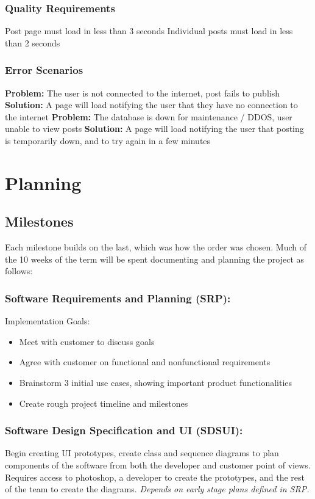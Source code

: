 \documentclass[12pt]{article}
\begin{document}
  \subsubsection{Quality Requirements}
  Post page must load in less than 3 seconds
  Individual posts must load in less than 2 seconds


  \subsubsection{Error Scenarios}
  \textbf{Problem:}
  The user is not connected to the internet, post fails to publish
  \textbf{Solution:}
    A page will load notifying the user that they have no connection to the internet
  \textbf{Problem:}
  The database is down for maintenance / DDOS, user unable to view posts
  \textbf{Solution:}
    A page will load notifying the user that posting is temporarily down, and to try again in a few minutes

\section{Planning}
\subsection{Milestones}
Each milestone builds on the last, which was how the order was chosen.
Much of the 10 weeks of the term will be spent documenting and planning the project as follows:

\subsubsection{Software Requirements and Planning (SRP):}
Implementation Goals:
\begin{itemize}
  \item Meet with customer to discuss goals
  \item Agree with customer on functional and nonfunctional requirements
  \item Brainstorm 3 initial use cases, showing important product functionalities
  \item Create rough project timeline and milestones
\end{itemize}

\subsubsection{Software Design Specification and UI (SDSUI):}
Begin creating UI prototypes, create class and sequence diagrams to plan
components of the software from both the developer and customer point of views.
Requires access to photoshop, a developer to create the prototypes, and the rest
of the team to create the diagrams. \textit{Depends on early stage plans defined in SRP.}
\end{document}
